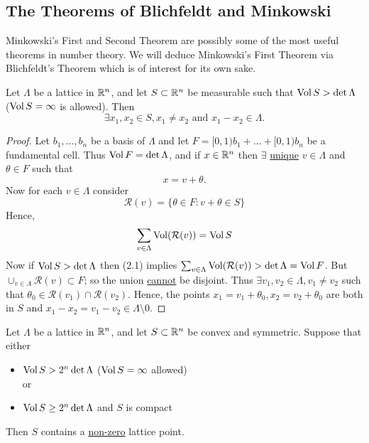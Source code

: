 \documentclass[NumTh.tex]{subfiles}
\begin{document}
\subsection{The Theorems of Blichfeldt and Minkowski}

Minkowski's First and Second Theorem are possibly some of the most useful theorems in number theory.
We will deduce Minkowski's First Theorem via Blichfeldt's Theorem which is of interest for its own sake.

\begin{theorem}
  Let $\Lambda$ be a lattice in $\mathbb{R}^n$, and let $S \subset \mathbb{R}^n$ be measurable such that $\operatorname{Vol} S > \det \Lambda$ ($\operatorname{Vol} S = \infty$ is allowed).
  Then 
  \[ \exists x_1,x_2 \in S, x_1 \neq x_2 \text{ and } x_1 - x_2 \in \Lambda \text{.}\]
\end{theorem}

\begin{proof}
  Let $b_1,\dots,b_n$ be a basis of $\Lambda$ and let $F = [0,1) b_1 + \dots + [0,1) b_n$ be a fundamental cell.
  Thus $\operatorname{Vol} F = \det \Lambda$, and if $x \in \mathbb{R}^n$ then $\exists$ \underline{unique} $v \in \Lambda$ and $\theta \in F$ such that
  \[ x = v + \theta \text{.}\]
  Now for each $v \in \Lambda$ consider
  \[ \mathcal{R}(v) = \{ \theta \in F : v + \theta \in S \} \]
  Hence, 
  \[ \sum_{v \in \Lambda} \operatorname{Vol}(\mathcal{R}(v)) = \operatorname{Vol} S \]
  Now if $\operatorname{Vol} S > \det \Lambda$ then (2.1) implies $\sum_{v \in \Lambda} \operatorname{Vol} (\mathcal{R}(v)) > \det \Lambda = \operatorname{Vol} F  $.
  But $\cup_{v \in \Lambda} \mathcal{R}(v) \subset F$; so the union \underline{cannot} be disjoint.
  Thus $\exists v_1,v_2 \in \Lambda, v_1 \neq v_2$ such that $\theta_0 \in \mathcal{R}(v_1) \cap \mathcal{R}(v_2)$.
  Hence, the points $x_1 = v_1 + \theta_0, x_2 = v_2 + \theta_0$ are both in $S$ and $x_1 - x_2 = v_1 - v_2 \in \Lambda \setminus 0$.
\end{proof}

\begin{theorem}
  Let $\Lambda$ be a lattice in $\mathbb{R}^n$, and let $S \subset \mathbb{R}^n$ be convex and symmetric.
  Suppose that either
  \begin{itemize}
    \item $\operatorname{Vol} S > 2^n \det \Lambda$ ($\operatorname{Vol} S = \infty$ allowed) \\
    or
    \item $\operatorname{Vol} S \geq 2^n \det \Lambda$ and $S$ is compact
  \end{itemize}
  Then $S$ contains a \underline{non-zero} lattice point.
\end{theorem}
\end{document}
